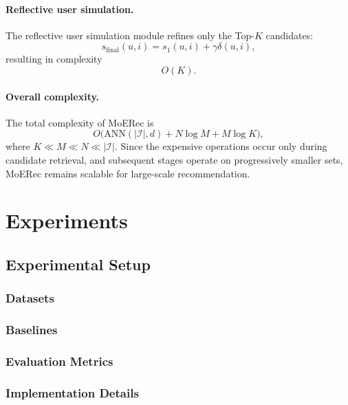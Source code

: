 \documentclass[sigconf,anonymous]{acmart}
\begin{document}
\paragraph{Reflective user simulation.}
The reflective user simulation module refines only the Top-$K$ candidates:
\begin{equation}
s_{\text{final}}(u,i)=s_1(u,i)+\gamma\delta(u,i),
\end{equation}
resulting in complexity
\begin{equation}
O(K).
\end{equation}

\paragraph{Overall complexity.}
The total complexity of MoERec is
\begin{equation}
O\big(\mathrm{ANN}(|\mathcal{I}|, d) + N\log M + M\log K \big),
\end{equation}
where $K \ll M \ll N \ll |\mathcal{I}|$. Since the expensive operations occur only during candidate retrieval, and subsequent stages operate on progressively smaller sets, MoERec remains scalable for large-scale recommendation.

\section{Experiments}

\subsection{Experimental Setup}

\subsubsection{Datasets}

\subsubsection{Baselines}

\subsubsection{Evaluation Metrics}

\subsubsection{Implementation Details}
\end{document}
